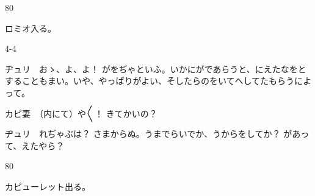 \documentclass[tate,paper=b6j,jafontsize=9pt]{jlreq}
\begin{document}
\begin{azconvIndented}{8\zw}{0\zw}

ロミオ入る。

\end{azconvIndented}
\begin{azconvIndented}{4\zw}{-4\zw}

ヂュリ　おゝ、よ、よ！ がをぢゃといふ。いかにがであらうと、にえたなをとすることもまい。いや、やっぱりがよい、そしたらのをいてへしてたもらうによって。

カピ妻　（内にて）や{〳〵}！ きてかいの？

ヂュリ　れぢゃぶは？ さまからぬ。うまでらいでか、うからをしてか？ があって、えたやら？

\end{azconvIndented}
\begin{azconvIndented}{8\zw}{0\zw}

カピューレット出る。

\end{azconvIndented}
\end{document}
